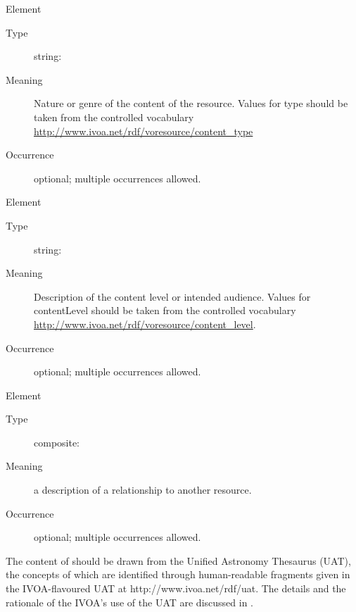 \documentclass[11pt,a4paper]{ivoa}
\begin{document}
\begin{generated}
\begin{bigdescription}
\begin{description}
\end{description}
\item[Element \xmlel{type}]
\begin{description}
\item[Type] string: 
\item[Meaning]
               Nature or genre of the content of the resource.  Values for
               type should be taken from the controlled vocabulary
               \url{http://www.ivoa.net/rdf/voresource/content_type}

\item[Occurrence] optional; multiple occurrences allowed.

\end{description}
\item[Element \xmlel{contentLevel}]
\begin{description}
\item[Type] string: 
\item[Meaning]
                Description of the content level or intended audience.
                Values for contentLevel should be taken from the controlled
                vocabulary
                \url{http://www.ivoa.net/rdf/voresource/content_level}.

\item[Occurrence] optional; multiple occurrences allowed.

\end{description}
\item[Element \xmlel{relationship}]
\begin{description}
\item[Type] composite: 
\item[Meaning]
               a description of a relationship to another resource.

\item[Occurrence] optional; multiple occurrences allowed.

\end{description}


\end{bigdescription}\endgroup

\endgroup
\end{generated}


The content of  should be drawn from the Unified
Astronomy Thesaurus (UAT), the concepts of which are identified through
human-readable fragments given in the IVOA-flavoured UAT at
http://www.ivoa.net/rdf/uat.  The details and the rationale of the
IVOA's use of the UAT are discussed in \citet{2022ivoa.spec.0722D}.
\end{document}
